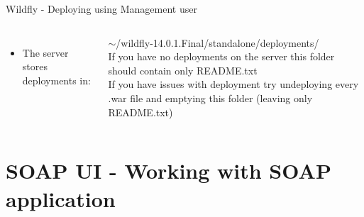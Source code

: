 \documentclass[aspectratio=1610,english]{beamer} %
\begin{document}
\begin{frame}{Wildfly - Deploying using Management user}
\begin{columns}
				\begin{itemize}
					\tiny
					\color{black}
					\item The server stores deployments in:
				\end{itemize}
				\tiny
				\raggedright{
				 $\sim$/wildfly-14.0.1.Final/standalone/deployments/ \\
				If you have no deployments on the server this folder should contain only README.txt \\
				If you have issues with deployment try undeploying every .war file and emptying this folder (leaving only README.txt)
				}
				
		\end{columns}
	\end{frame}
	\section{SOAP UI - Working with SOAP application}
\end{document}
